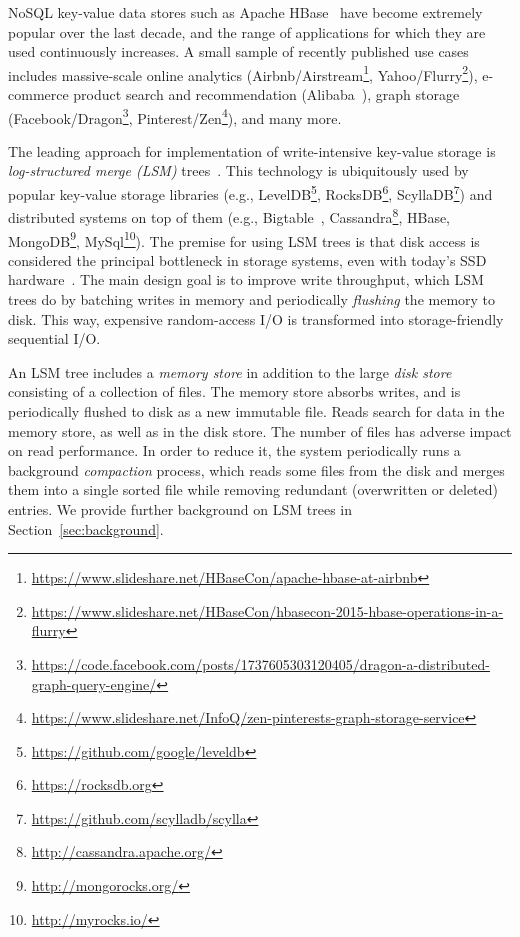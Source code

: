 
NoSQL key-value data stores such as Apache HBase~\cite{hbase} have become extremely popular over the last decade, 
and the range of applications for which they are used continuously increases. A small sample of  recently 
published use cases includes massive-scale online analytics (Airbnb/Airstream\footnote{\small{\url{https://www.slideshare.net/HBaseCon/apache-hbase-at-airbnb}}}, 
Yahoo/Flurry\footnote{\small{\url{https://www.slideshare.net/HBaseCon/hbasecon-2015-hbase-operations-in-a-flurry}}}), e-commerce product search 
and recommendation (Alibaba~\cite{alibabahbase}), 
graph storage (Facebook/Dragon\footnote{\small{\url{https://code.facebook.com/posts/1737605303120405/dragon-a-distributed-graph-query-engine/}}}, 
Pinterest/Zen\footnote{\small{\url{https://www.slideshare.net/InfoQ/zen-pinterests-graph-storage-service}}}), and many more. 


The leading approach for implementation of write-intensive key-value storage is \emph{log-structured merge (LSM)} trees~\cite{O'Neil:1996}.
This technology is ubiquitously used by popular key-value storage libraries (e.g., LevelDB\footnote{\small{\url{https://github.com/google/leveldb}}}, 
RocksDB\footnote{\small{\url{https://rocksdb.org}}}, ScyllaDB\footnote{\small{\url{https://github.com/scylladb/scylla}}}) and distributed systems on top 
of them (e.g., Bigtable~\cite{Chang2008}, Cassandra\footnote{\small{\url{http://cassandra.apache.org/}}}, HBase, 
MongoDB\footnote{\small{\url{http://mongorocks.org/}}}, MySql\footnote{\small{\url{http://myrocks.io/}}}). 
The premise for using LSM trees is that disk access is considered the principal bottleneck in storage systems, even with today's SSD hardware~\cite{rocksdb,Tanenbaum:2014:MOS:2655363,Wu:2012:AWB:2093139.2093140}. 
The main design goal is to improve write throughput, which LSM trees do by batching writes in memory 
and periodically \emph{flushing} the memory  to disk. This way, expensive random-access I/O is transformed 
into storage-friendly sequential I/O. 

An LSM tree includes a \emph{memory store} in addition to the large \emph{disk store} consisting of a collection of files. 
The memory store absorbs writes, and is periodically flushed to disk as a new immutable file. Reads search for  data
in the memory store, as well as in the disk store. The number of files has adverse impact on read performance. 
In order to reduce it, the system periodically runs a background \emph{compaction} process, which reads some files from 
the disk and merges them into a single sorted file while removing redundant (overwritten or deleted) entries.
We provide further background on LSM trees in Section~\ref{sec:background}.

